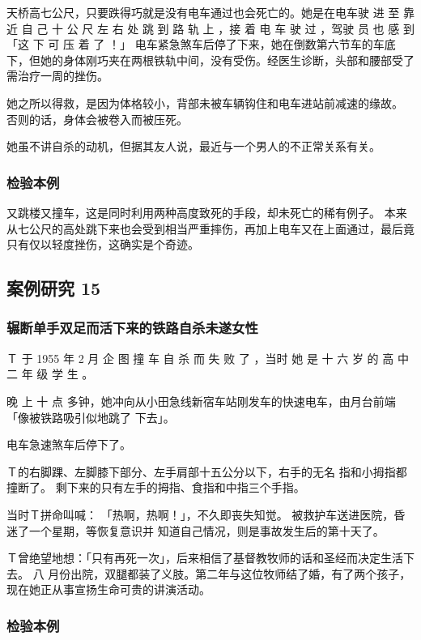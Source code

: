\documentclass[UTF8]{ctexart}
\begin{document}
天桥高七公尺，只要跌得巧就是没有电车通过也会死亡的。她是在电车驶 进 至 靠 近 自 己 十 公 尺 左 右 处 跳 到 路 轨 上 ，接 着 电 车 驶 过 ，驾驶 员 也 感 到「这 下 可 压 着 了 ！」 电车紧急煞车后停了下来，她在倒数第六节车的车底下，但她的身体刚巧夹在两根铁轨中间，没有受伤。经医生诊断，头部和腰部受了需治疗一周的挫伤。

她之所以得救，是因为体格较小，背部未被车辆钩住和电车进站前减速的缘故。
否则的话，身体会被卷入而被压死。

她虽不讲自杀的动机，但据其友人说，最近与一个男人的不正常关系有关。

\subsubsection*{检验本例}

又跳楼又撞车，这是同时利用两种高度致死的手段，却未死亡的稀有例子。
本来从七公尺的高处跳下来也会受到相当严重摔伤，再加上电车又在上面通过，最后竟只有仅以轻度挫伤，这确实是个奇迹。


\subsection{案例研究 15}

\subsubsection*{辗断单手双足而活下来的铁路自杀未遂女性}

Ｔ 于 1955 年 2 月 企 图 撞 车 自 杀 而 失 败 了 ，当时 她 是 十 六 岁 的 高 中 二 年 级 学 生 。

晚 上 十 点 多钟，她冲向从小田急线新宿车站刚发车的快速电车，由月台前端「像被铁路吸引似地跳了 下去」。

电车急速煞车后停下了。

Ｔ的右脚踝、左脚膝下部分、左手肩部十五公分以下，右手的无名 指和小拇指都撞断了。
剩下来的只有左手的拇指、食指和中指三个手指。

当时Ｔ拼命叫喊： 「热啊，热啊！」，不久即丧失知觉。
被救护车送进医院，昏迷了一个星期，等恢复意识并 知道自己情况，则是事故发生后的第十天了。

Ｔ曾绝望地想：「只有再死一次」，后来相信了基督教牧师的话和圣经而决定生活下去。
八 月份出院，双腿都装了义肢。第二年与这位牧师结了婚，有了两个孩子，现在她正从事宣扬生命可贵的讲演活动。

\subsubsection*{检验本例}
\end{document}
